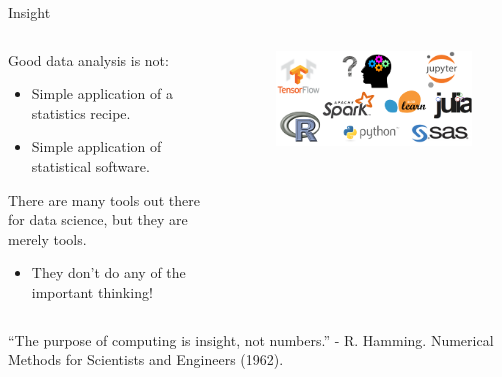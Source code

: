 \documentclass[aspectratio=169]{../latex_main/tntbeamer}  %
\begin{document}
    \begin{frame}[c]{Insight}
        \begin{columns}
        \begin{column}{.5\textwidth}
        
        Good data analysis is not:
        \begin{itemize}
            \item Simple application of a statistics recipe.
            \item Simple application of statistical software.
        \end{itemize}
        There are many tools out there for data science, but they are merely tools.
        \begin{itemize}
            \item They don’t do any of the important thinking!
        \end{itemize}
        \end{column}
        \begin{column}{.4\textwidth}
        
            \begin{figure}
                \centering
                \includegraphics[width=1.0\textwidth]{bild4}
            \end{figure}
            
        \end{column}
        
        
        \end{columns}
        \bigskip
        “The purpose of computing is insight, not numbers.” - R. Hamming. Numerical Methods for Scientists and Engineers (1962).

    \end{frame}
    
\end{document}
